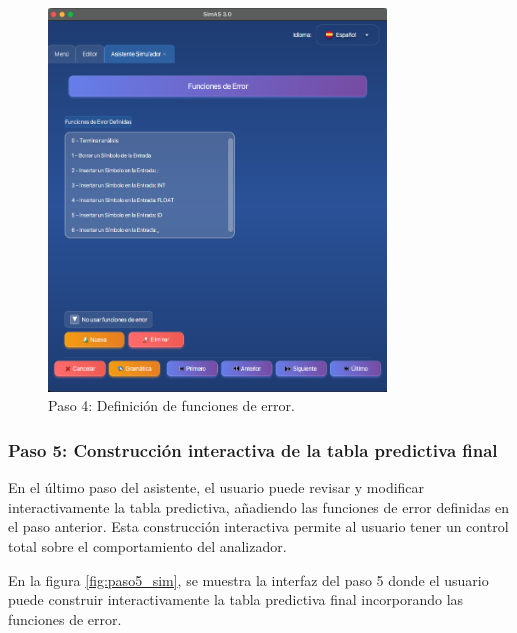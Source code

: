 \needspace{6cm}
\begin{figure}[H]
\centering
\includegraphics[width=0.8\textwidth]{figuras2/simulador/paso4_funcionesError.png}
\caption{Paso 4: Definición de funciones de error.}
\label{fig:paso4_sim}
\end{figure}

\subsubsection{Paso 5: Construcción interactiva de la tabla predictiva final}

En el último paso del asistente, el usuario puede revisar y modificar interactivamente la tabla predictiva, añadiendo las funciones de error definidas en el paso anterior. Esta construcción interactiva permite al usuario tener un control total sobre el comportamiento del analizador.

En la figura \ref{fig:paso5_sim}, se muestra la interfaz del paso 5 donde el usuario puede construir interactivamente la tabla predictiva final incorporando las funciones de error.

